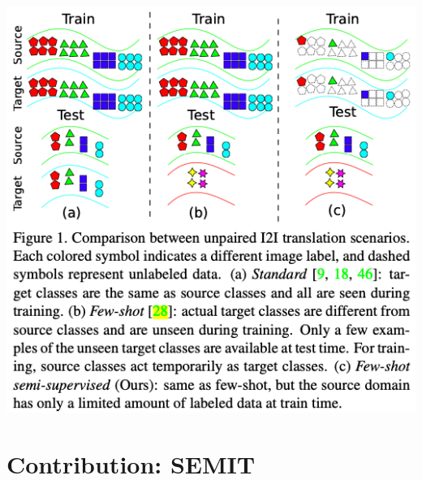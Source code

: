 \documentclass[10pt]{article}
\begin{document}
            \includegraphics[width=\linewidth]{src/img/Comparison between unpaired I2I translation scenarios.png} \\ 
        
    \section*{Contribution: SEMIT}
\end{document}
